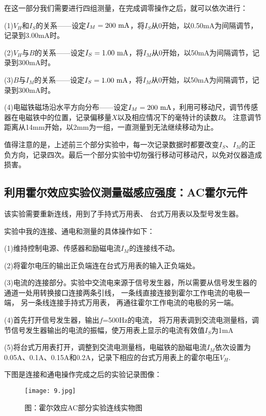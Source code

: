 \documentclass[11pt]{article}
\renewcommand{\emph}[1]{\begin{kaishu}#1\end{kaishu}}
\begin{document}
	在这一部分我们需要进行四组测量，在完成调零操作之后，就可以依次进行：
	

(1)$V_H$和$I_S$的关系——设定$I_M=200\,\,{\rm mA}$，将$I_S$从0开始，以0.50mA为间隔调节，记录到3.00mA时。

(2)$V_H$与$B$的关系——设定$I_S=1.00\,\,{\rm mA}$，将$I_M$从0开始，以50mA为间隔调节，记录到300mA时。

(3)$B$与$I_M$的关系——设定$I_S=1.00\,\,{\rm mA}$，将$I_M$从0开始，以50mA为间隔调节，记录到300mA时。

(4)电磁铁磁场沿水平方向分布——设定$I_M=200\,\,{\rm mA}$，利用可移动尺，调节传感器在电磁铁中的位置，记录偏移量$X$以及相应情况下的毫特计的读数$B$。
注意调节距离从14mm开始，以2mm为一组，一直测量到无法继续移动为止。

	
值得注意的是，上述前三个部分实验中，每一次记录数据时都要改变$I_S$、$I_M$的正负方向，记录四次。最后一个部分实验中切勿强行移动可移动尺，以免对仪器造成损害。



\subsection{利用霍尔效应实验仪测量磁感应强度：AC霍尔元件}

	该实验需要重新连线，用到了手持式万用表、
	台式万用表以及型号发生器。
	
	实验中我的连接、通电和测量的具体操作如下：
	
(1)维持控制电源、传感器和励磁电流$I_M$的连接线不动。

(2)将霍尔电压的输出正负端连在台式万用表的输入正负端处。

(3)电流的连接部分。实验中交流电来源于信号发生器，所以需要从信号发生器的
	通道一处用转换接口连接两条引线，
	一条线直接连接到霍尔工作电流的电极一端，
	另一条线连接手持式万用表，
	再通往霍尔工作电流的电极的另一端。

(4)首先打开信号发生器，输出$f$=500Hz的电流，
将万用表调到交流电测量档，调节信号发生器输出的电流的振幅，使万用表上显示的电流有效值$I_S$为1mA

(5)将台式万用表打开，调整到交流电测量档，电磁铁的励磁电流$I_M$依次设置为0.05A、0.1A、0.15A和0.2A，记录下相应的台式万用表上的霍尔电压$V_H$.

下图是连接和通电操作完成之后的实验记录图像：

	\begin{figure}[H]
	\centering
	\texttt{[image: 9.jpg]}
	\bf\emph{\caption*{图：霍尔效应AC部分实验连线实物图}} 
	\end{figure}
\end{document}
